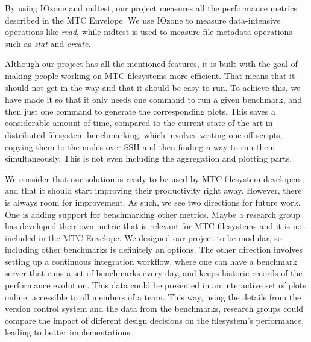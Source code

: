 By using IOzone and mdtest, our project measures all the performance metrics described in the MTC Envelope\cite{envelope}. We use IOzone to measure data-intensive operations like \textit{read}, while mdtest is used to measure file metadata operations such as \textit{stat} and \textit{create}.

Although our project has all the mentioned features, it is built with the goal of making people working on MTC filesystems more efficient. That means that it should not get in the way and that it should be easy to run. To achieve this, we have made it so that it only needs one command to run a given benchmark, and then just one command to generate the corresponding plots. This saves a considerable amount of time, compared to the current state of the art in distributed filesystem benchmarking, which involves writing one-off scripts, copying them to the nodes over SSH and then finding a way to run them simultaneously. This is not even including the aggregation and plotting parts.

We consider that our solution is ready to be used by MTC filesystem developers, and that it should start improving their productivity right away. However, there is always room for improvement. As such, we see two directions for future work. One is adding support for benchmarking other metrics. Maybe a research group has developed their own metric that is relevant for MTC filesystems and it is not included in the MTC Envelope. We designed our project to be modular, so including other benchmarks is definitely an options. The other direction involves setting up a continuous integration workflow, where one can have a benchmark server that runs a set of benchmarks every day, and keeps historic records of the performance evolution. This data could be presented in an interactive set of plots online, accessible to all members of a team. This way, using the details from the version control system and the data from the benchmarks, research groups could compare the impact of different design decisions on the filesystem's performance, leading to better implementations.
